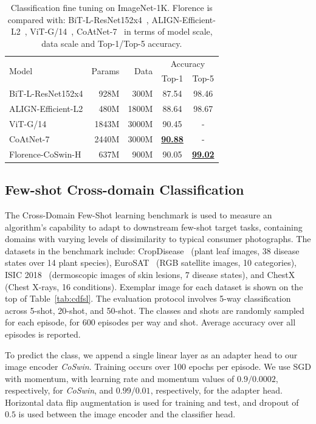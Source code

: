 \documentclass{article}
\begin{document}
\begin{table}[t]
\centering
\setlength{\tabcolsep}{6.3pt}
\small
\renewcommand{\arraystretch}{1.35}
\begin{tabular}{l|rrcc}
\toprule
\multirow{2}{*}{Model} & \multirow{2}{*}{Params} & \multirow{2}{*}{Data\;} &
\multicolumn{2}{c}{Accuracy} \\
& & & Top-1 & Top-5\\ \midrule
BiT-L-ResNet152x4 & 928M & 300M & 87.54 & 98.46  \\
ALIGN-Efficient-L2 & 480M & 1800M & 88.64 & 98.67  \\
ViT-G/14 & 1843M & 3000M & 90.45 & -  \\
CoAtNet-7 & 2440M & 3000M & \underline{\bf{90.88}} & - \\
Florence-CoSwin-H & 637M & 900M & 90.05 & \underline{\bf{99.02}}  \\ \bottomrule
\end{tabular}
\caption{Classification fine tuning on ImageNet-1K. Florence is compared with: BiT-L-ResNet152x4~\cite{kolesnikov2020big}, ALIGN-Efficient-L2~\cite{jia2021scaling}, ViT-G/14~\cite{zhai2021scaling}, CoAtNet-7~\cite{dai2021coatnet} in terms of model scale, data scale and Top-1/Top-5 accuracy.}
\label{tab:imagenet_result}
\end{table}


\subsection{Few-shot Cross-domain Classification}

The Cross-Domain Few-Shot learning benchmark \cite{cdfsl} is used to measure an algorithm's capability to adapt to downstream few-shot target tasks, containing domains with varying levels of dissimilarity to typical consumer photographs. The datasets in the benchmark include: CropDisease~\cite{plantdisease} (plant leaf images, 38 disease states over 14 plant species), EuroSAT~\cite{eurosat} (RGB satellite images, 10 categories), ISIC 2018~\cite{isic2018,ham10000} (dermoscopic images of skin lesions, 7 disease states), and ChestX~\cite{chestx} (Chest X-rays, 16 conditions). Exemplar image for each dataset is shown on the top of Table~\ref{tab:cdfsl}. The evaluation protocol involves 5-way classification across 5-shot, 20-shot, and 50-shot. The classes and shots are randomly sampled for each episode, for 600 episodes per way and shot. Average accuracy over all episodes is reported.

To predict the class, we append a single linear layer as an adapter head to our image encoder \emph{CoSwin}. Training occurs over 100 epochs per episode. We use SGD with momentum, with learning rate and momentum values of $0.9/ 0.0002$, respectively, for \emph{CoSwin}, and $0.99/0.01$, respectively, for the adapter head. Horizontal data flip augmentation is used for training and test, and dropout of $0.5$ is used between the image encoder and the classifier head.
\end{document}
